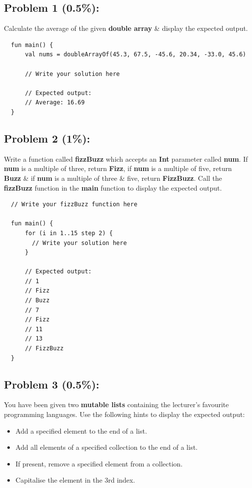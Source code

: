 \documentclass{article}
\begin{document}
\subsection*{Problem 1 (0.5\%):}
Calculate the average of the given \textbf{double array} \& display the expected output.

\begin{verbatim}
  fun main() {
      val nums = doubleArrayOf(45.3, 67.5, -45.6, 20.34, -33.0, 45.6)

      // Write your solution here

      // Expected output:
      // Average: 16.69 
  }
\end{verbatim}

\subsection*{Problem 2 (1\%):}
Write a function called \textbf{fizzBuzz} which accepts an \textbf{Int} parameter called \textbf{num}. If \textbf{num} is a multiple of three, return \textbf{Fizz}, if \textbf{num} is a multiple of five, return \textbf{Buzz} \& if \textbf{num} is a multiple of three \& five, return \textbf{FizzBuzz}. Call the \textbf{fizzBuzz} function in the \textbf{main} function to display the expected output.

\begin{verbatim}
  // Write your fizzBuzz function here
  
  fun main() {
      for (i in 1..15 step 2) {
        // Write your solution here
      }

      // Expected output:
      // 1
      // Fizz
      // Buzz
      // 7
      // Fizz
      // 11
      // 13
      // FizzBuzz
  }
\end{verbatim}

\subsection*{Problem 3 (0.5\%):} You have been given two \textbf{mutable lists} containing the lecturer's favourite programming languages. Use the following hints to display the expected output:
\begin{itemize}
  \item Add a specified element to the end of a list.
  \item Add all elements of a specified collection to the end of a list.
  \item If present, remove a specified element from a collection.
  \item Capitalise the element in the 3rd index.
\end{itemize}
\end{document}
